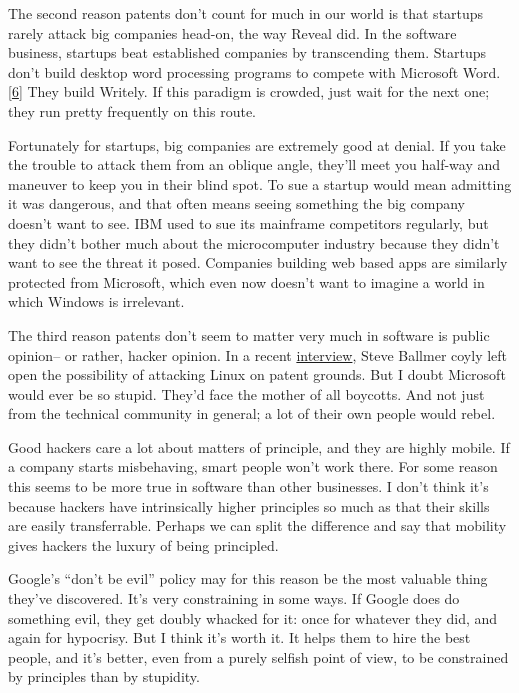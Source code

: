 The second reason patents don't count for much in our world is that
startups rarely attack big companies head-on, the way Reveal did. In the
software business, startups beat established companies by transcending
them. Startups don't build desktop word processing programs to compete
with Microsoft Word. {[}\hyperref[f6n]{6}{]} They build Writely. If this
paradigm is crowded, just wait for the next one; they run pretty
frequently on this route.

Fortunately for startups, big companies are extremely good at denial. If
you take the trouble to attack them from an oblique angle, they'll meet
you half-way and maneuver to keep you in their blind spot. To sue a
startup would mean admitting it was dangerous, and that often means
seeing something the big company doesn't want to see. IBM used to sue
its mainframe competitors regularly, but they didn't bother much about
the microcomputer industry because they didn't want to see the threat it
posed. Companies building web based apps are similarly protected from
Microsoft, which even now doesn't want to imagine a world in which
Windows is irrelevant.

The third reason patents don't seem to matter very much in software is
public opinion-- or rather, hacker opinion. In a recent
\href{http://www.computing.co.uk/forbes/news/2152720/interview-steve-ballmer-linux}{interview},
Steve Ballmer coyly left open the possibility of attacking Linux on
patent grounds. But I doubt Microsoft would ever be so stupid. They'd
face the mother of all boycotts. And not just from the technical
community in general; a lot of their own people would rebel.

Good hackers care a lot about matters of principle, and they are highly
mobile. If a company starts misbehaving, smart people won't work there.
For some reason this seems to be more true in software than other
businesses. I don't think it's because hackers have intrinsically higher
principles so much as that their skills are easily transferrable.
Perhaps we can split the difference and say that mobility gives hackers
the luxury of being principled.

Google's ``don't be evil'' policy may for this reason be the most
valuable thing they've discovered. It's very constraining in some ways.
If Google does do something evil, they get doubly whacked for it: once
for whatever they did, and again for hypocrisy. But I think it's worth
it. It helps them to hire the best people, and it's better, even from a
purely selfish point of view, to be constrained by principles than by
stupidity.

